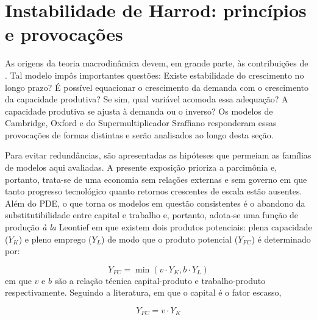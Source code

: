 
\section{Instabilidade de Harrod: princípios e provocações}\label{SecHarrod}


As origens da teoria macrodinâmica devem, em grande parte, às contribuições de \textcite{harrod_essay_1939}. Tal modelo impôs importantes questões: Existe estabilidade do crescimento no longo pra\-zo? É possível equacionar o crescimento da demanda com o crescimento da capacidade produtiva? Se sim, qual variável acomoda essa adequação? A capacidade produtiva se ajusta à demanda ou o inverso? Os modelos de Cambridge, Oxford e do Supermultiplicador Sraffiano responderam essas provocações de formas distintas e serão analisados ao longo desta seção.


Para evitar redundâncias, são apresentadas as hipóteses que permeiam as famílias de modelos aqui avaliadas. 
A presente exposição prioriza a parcimônia e, portanto, trata-se de uma economia sem relações externas e sem governo em que tanto progresso tecnológico quanto retornos crescentes de escala estão ausentes. Além do PDE, o que torna os modelos em questão consistentes
é o abandono da substitutibilidade entre capital e trabalho e, portanto, adota-se uma função de produção
\textit{à la} Leontief em que existem dois produtos potenciais: plena capacidade ($Y_K$) e pleno emprego ($Y_L$) de modo que o produto potencial ($Y_{FC}$) é determinado por:

\begin{equation}
    Y_{FC} = \min (v\cdot Y_K, b\cdot Y_L)
\end{equation}
em que $v$  e $b$ são a relação técnica capital-produto e trabalho-produto respectivamente. Seguindo a literatura, em que o capital é o fator escasso,

\begin{equation}
\label{Oferta}
    Y_{FC} = v\cdot Y_K
\end{equation}

